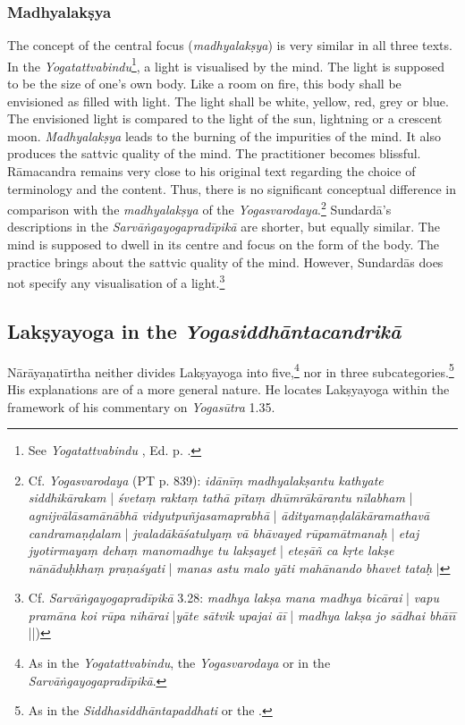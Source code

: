 \subsubsection{Madhyalakṣya}

The concept of the central focus (\textit{madhyalakṣya}) is very similar in all three texts. In the \textit{Yogatattvabindu}\footnote{See \textit{Yogatattvabindu} , Ed. p. \pageref{madhyalaksya}.}, a light is visualised by the mind. The light is supposed to be the size of one's own body. Like a room on fire, this body shall be envisioned as filled with light. The light shall be white, yellow, red, grey or blue. The envisioned light is compared to the light of the sun, lightning or a crescent moon. \textit{Madhyalakṣya} leads to the burning of the impurities of the mind. It also produces the sattvic quality of the mind. The practitioner becomes blissful. Rāmacandra remains very close to his original text regarding the choice of terminology and the content. Thus, there is no significant conceptual difference in comparison with the \textit{madhyalakṣya} of the \textit{Yogasvarodaya}.\footnote{Cf. \textit{Yogasvarodaya} (PT p. 839): \textit{idānīṃ madhyalakṣantu kathyate siddhikārakam} | \textit{śvetaṃ raktaṃ tathā pītaṃ dhūmrākārantu nīlabham} | \textit{agnijvālāsamānābhā vidyutpuñjasamaprabhā} | \textit{ādityamaṇḍalākāramathavā candramaṇḍalam} | \textit{jvaladākāśatulyaṃ vā bhāvayed rūpamātmanaḥ} | \textit{etaj jyotirmayaṃ dehaṃ manomadhye tu lakṣayet} | \textit{eteṣāñ ca kṛte lakṣe nānāduḥkhaṃ praṇaśyati} | \textit{manas astu malo yāti mahānando bhavet tataḥ} |} Sundardā's descriptions in the \textit{Sarvāṅgayogapradīpikā} are shorter, but equally similar. The mind is supposed to dwell in its centre and focus on the form of the body. The practice brings about the sattvic quality of the mind. However, Sundardās does not specify any visualisation of a light.\footnote{Cf. \textit{Sarvāṅgayogapradīpikā} 3.28: \textit{madhya lakṣa mana madhya bicārai} | \textit{vapu pramāna koi rūpa nihārai} |\textit{yāte sātvik upajai āī} | \textit{madhya lakṣa jo sādhai bhāīī} ||)}

\subsection{Lakṣyayoga in the \textit{Yogasiddhāntacandrikā}}
\label{laksyayogaintrocandrika}

Nārāyaṇatīrtha neither divides Lakṣyayoga into five,\footnote{As in the \textit{Yogatattvabindu}, the \textit{Yogasvarodaya} or in the \textit{Sarvāṅgayogapradīpikā}.} nor in three subcategories.\footnote{As in the \textit{Siddhasiddhāntapaddhati} or the .} His explanations are of a more general nature. He locates Lakṣyayoga within the framework of his commentary on \textit{Yogasūtra} 1.35.

